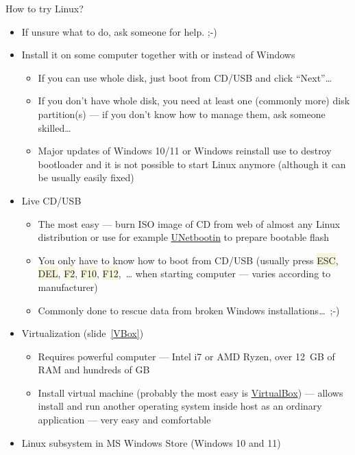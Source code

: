 \documentclass[compress, xelatex, 11pt, xcolor=svgnames, aspectratio=169,
	hyperref={
		bookmarks=true,
		unicode=true,
		colorlinks=true,
		pdftitle={Linux, command line and MetaCentrum},
		plainpages=false,
		pdfauthor={Vojtech Zeisek},
		pdfsubject={Course about use of Linux command line, writing shell scripts and using MetaCentrum of CESNET},
		pdfcreator={XeLaTeX},
		pdfkeywords={Linux, GNU, BASH, shell, command line, MetaCentrum},
		linkcolor=DarkRed, %
		anchorcolor=DarkBlue, %
		citecolor=Indigo, %
		filecolor=NavyBlue, %
		menucolor=DarkMagenta, %
		urlcolor=DarkBlue, %
		},
	url={hyphens, lowtilde} %
	]{beamer}
\renewcommand{\texttt}[1]{\colorbox{Beige}{{\ttfamily #1}}}
\begin{document}

\begin{frame}[allowframebreaks]{How to try Linux?}
	\begin{itemize}
		\item If unsure what to do, ask someone for help. ;-)
		\item Install it on some computer together with or instead of Windows
		\begin{itemize}
			\item If you can use whole disk, just boot from CD/USB and click \enquote{Next}\ldots
			\item If you don't have whole disk, you need at least one (commonly more) disk partition(s) --- if you don't know how to manage them, ask someone skilled\ldots
			\item Major updates of Windows 10/11 or Windows reinstall use to destroy bootloader and it is not possible to start Linux anymore (although it can be usually easily fixed)
		\end{itemize}
		\item Live CD/USB
		\begin{itemize}
			\item The most easy --- burn ISO image of CD from web of almost any Linux distribution or use for example \href{https://unetbootin.github.io/}{UNetbootin} to prepare bootable flash
			\item You only have to know how to boot from CD/USB (usually press \texttt{ESC}, \texttt{DEL}, \texttt{F2}, \texttt{F10}, \texttt{F12},~\ldots{ }when starting computer --- varies according to manufacturer)
			\item Commonly done to rescue data from broken Windows installations\ldots~;-)
		\end{itemize}
		\item Virtualization (slide~\ref{VBox})
		\begin{itemize}
			\item Requires powerful computer --- Intel i7 or AMD Ryzen, over 12~GB of RAM and hundreds of GB
			\item Install virtual machine (probably the most easy is \href{https://www.virtualbox.org/}{VirtualBox}) --- allows install and run another operating system inside host as an ordinary application --- very easy and comfortable
		\end{itemize}
		\item Linux subsystem in MS Windows Store (Windows 10 and 11)

\end{itemize}
\end{frame}
\end{document}
